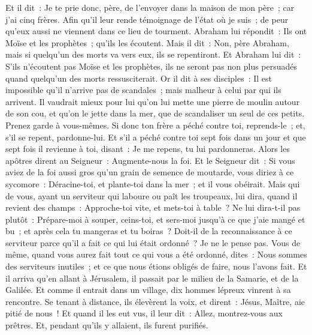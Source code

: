 \begin{multicols}{2}
Et il dit~: Je te prie donc, père, de l'envoyer dans la maison de mon père~; car j'ai cinq frères.
Afin qu'il leur rende témoignage de l'état où je suis~; de peur qu'eux aussi ne viennent dans ce lieu de tourment.
Abraham lui répondit~: Ils ont Moïse et les prophètes~; qu'ils les écoutent.
Mais il dit~: Non, père Abraham, mais si quelqu'un des morts va vers eux, ils se repentiront.
Et Abraham lui dit~: S'ils n'écoutent pas Moïse et les prophètes, ils ne seront pas non plus persuadés quand quelqu'un des morts ressusciterait.
\VerseOne{}Or il dit à ses disciples~: Il est impossible qu'il n'arrive pas de scandales~; mais malheur à celui par qui ils arrivent.
Il vaudrait mieux pour lui qu'on lui mette une pierre de moulin autour de son cou, et qu'on le jette dans la mer, que de scandaliser un seul de ces petits.
Prenez garde à vous-mêmes. Si donc ton frère a péché contre toi, reprends-le~; et, s'il se repent, pardonne-lui.
Et s'il a péché contre toi sept fois dans un jour et que sept fois il revienne à toi, disant~: Je me repens, tu lui pardonneras.
Alors les apôtres dirent au Seigneur~: Augmente-nous la foi.
Et le Seigneur dit~: Si vous aviez de la foi aussi gros qu'un grain de semence de moutarde, vous diriez à ce sycomore~: Déracine-toi, et plante-toi dans la mer~; et il vous obéirait.
Mais qui de vous, ayant un serviteur qui laboure ou paît les troupeaux, lui dira, quand il revient des champs~: Approche-toi vite, et mets-toi à table~?
Ne lui dira-t-il pas plutôt~: Prépare-moi à souper, ceins-toi, et sers-moi jusqu'à ce que j'aie mangé et bu~; et après cela tu mangeras et tu boiras~?
Doit-il de la reconnaissance à ce serviteur parce qu'il a fait ce qui lui était ordonné~? Je ne le pense pas.
Vous de même, quand vous aurez fait tout ce qui vous a été ordonné, dites~: Nous sommes des serviteurs inutiles~; et ce que nous étions obligés de faire, nous l'avons fait.
Et il arriva qu'en allant à Jérusalem, il passait par le milieu de la Samarie, et de la Galilée.
Et comme il entrait dans un village, dix hommes lépreux vinrent à sa rencontre. Se tenant à distance, ils élevèrent la voix, et dirent~:
Jésus, Maître, aie pitié de nous~!
Et quand il les eut vus, il leur dit~: Allez, montrez-vous aux prêtres. Et, pendant qu'ils y allaient, ils furent purifiés.

\end{multicols}
